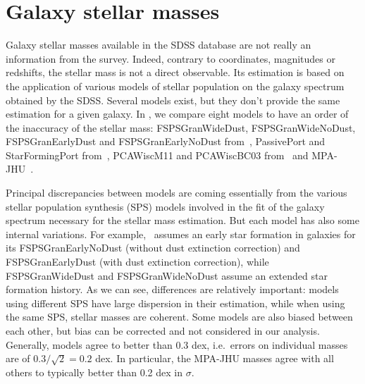 \section{Galaxy stellar masses}

Galaxy stellar masses available in the SDSS database are not really an
information from the survey. Indeed, contrary to coordinates, magnitudes or
redshifts, the stellar mass is not a direct observable. Its estimation is based
on the application of various models of stellar population on the galaxy
spectrum obtained by the SDSS\@. Several models exist, but they don't provide
the same estimation for a given galaxy. In ,
we compare eight models to have an order of the inaccuracy of the stellar mass:
FSPSGranWideDust, FSPSGranWideNoDust, FSPSGranEarlyDust and FSPSGranEarlyNoDust
from~\cite{Conroy+09}, PassivePort and StarFormingPort from~\cite{Maraston+09},
PCAWiscM11 and PCAWiscBC03 from~\cite{Chen+12} and MPA-JHU~\cite{Brinchmann+04,
Kauffmann+03, Tremonti+04}.

Principal discrepancies between models are coming essentially from the various
stellar population synthesis (SPS) models involved in the fit of the galaxy
spectrum necessary for the stellar mass estimation. But each model has also
some internal variations. For example,~\cite{Conroy+09} assumes an early star
formation in galaxies for its FSPSGranEarlyNoDust (without dust extinction
correction) and FSPSGranEarlyDust (with dust extinction correction), while
FSPSGranWideDust and FSPSGranWideNoDust assume an extended star formation
history. As we can see, differences are relatively important: models using
different SPS have large dispersion in their estimation, while when using the
same SPS, stellar masses are coherent. Some models are also biased between each
other, but bias can be corrected and not considered in our analysis. Generally,
models agree to better than 0.3 dex, i.e.\ errors on individual masses are of
$0.3 / \sqrt{2} = 0.2$ dex. In particular, the MPA-JHU masses agree with all
others to typically better than 0.2 dex in $\sigma$.

